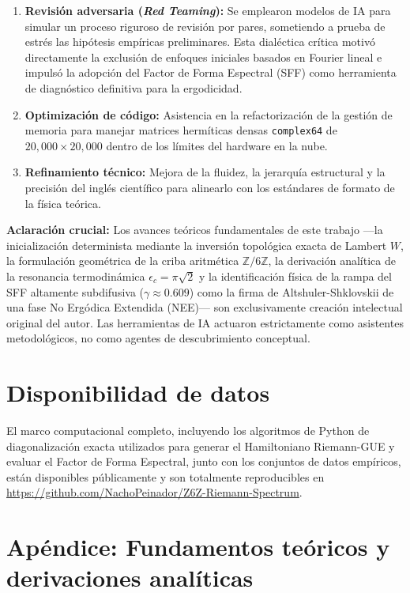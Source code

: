 \documentclass[aps,prl,preprint,superscriptaddress,floatfix]{revtex4-2}
\begin{document}
\begin{acknowledgments}
\begin{enumerate}
    \item \textbf{Revisión adversaria (\textit{Red Teaming}):} Se emplearon modelos de IA para simular un proceso riguroso de revisión por pares, sometiendo a prueba de estrés las hipótesis empíricas preliminares. Esta dialéctica crítica motivó directamente la exclusión de enfoques iniciales basados en Fourier lineal e impulsó la adopción del Factor de Forma Espectral (SFF) como herramienta de diagnóstico definitiva para la ergodicidad.
    \item \textbf{Optimización de código:} Asistencia en la refactorización de la gestión de memoria para manejar matrices hermíticas densas \texttt{complex64} de $20,000 \times 20,000$ dentro de los límites del hardware en la nube.
    \item \textbf{Refinamiento técnico:} Mejora de la fluidez, la jerarquía estructural y la precisión del inglés científico para alinearlo con los estándares de formato de la física teórica.
\end{enumerate}

\textbf{Aclaración crucial:} Los avances teóricos fundamentales de este trabajo —la inicialización determinista mediante la inversión topológica exacta de Lambert $W$, la formulación geométrica de la criba aritmética $\mathbb{Z}/6\mathbb{Z}$, la derivación analítica de la resonancia termodinámica $\epsilon_c = \pi\sqrt{2}$ y la identificación física de la rampa del SFF altamente subdifusiva ($\gamma \approx 0.609$) como la firma de Altshuler-Shklovskii de una fase No Ergódica Extendida (NEE)— son exclusivamente creación intelectual original del autor. Las herramientas de IA actuaron estrictamente como asistentes metodológicos, no como agentes de descubrimiento conceptual.
\end{acknowledgments}

\section{Disponibilidad de datos}
El marco computacional completo, incluyendo los algoritmos de Python de diagonalización exacta utilizados para generar el Hamiltoniano Riemann-GUE y evaluar el Factor de Forma Espectral, junto con los conjuntos de datos empíricos, están disponibles públicamente y son totalmente reproducibles en \url{https://github.com/NachoPeinador/Z6Z-Riemann-Spectrum}.

\appendix

\section{Apéndice: Fundamentos teóricos y derivaciones analíticas}
\label{app:theory}
\end{document}
